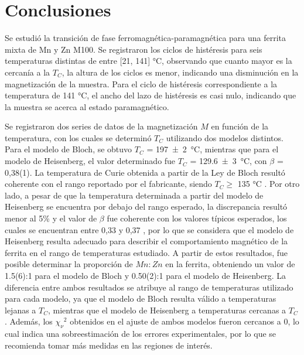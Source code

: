 \section{Conclusiones}

Se estudió la transición de fase ferromagnética-paramagnética para una ferrita mixta de Mn y Zn M100. Se registraron los ciclos de histéresis para seis temperaturas distintas de entre [21, 141] \si{\degreeCelsius}, observando que cuanto mayor es la cercanía a la $T_C$, la altura de los ciclos es menor, indicando una disminución en la magnetización de la muestra. Para el ciclo de histéresis correspondiente a la temperatura de 141 \si{\degreeCelsius}, el ancho del lazo de histéresis es casi nulo, indicando que la muestra se acerca al estado paramagnético.


Se registraron dos series de datos de la magnetización $M$ en función de la temperatura, con los cuales se determinó $T_C$ utilizando dos modelos distintos. Para el modelo de Bloch, se obtuvo $T_C$ = \SI{197(2)}{\celsius}, mientras que para el modelo de Heisenberg, el valor determinado fue $T_C$ = \SI{129,6(3)}{\celsius}, con $\beta$ = 0,38(1). La temperatura de Curie obtenida a partir de la Ley de Bloch resultó coherente con el rango reportado por el fabricante, siendo $T_C \geq$ 135 \si{\degreeCelsius} \cite{M100}. Por otro lado, a pesar de que la temperatura determinada a partir del modelo de Heisenberg se encuentra por debajo del rango esperado, la discrepancia resultó menor al 5\% y el valor de $\beta$ fue coherente con los valores típicos esperados, los cuales se encuentran entre 0,33 y 0,37 \cite{Bruvera}, por lo que se considera que el modelo de Heisenberg resulta adecuado para describir el comportamiento magnético de la ferrita en el rango de temperaturas estudiado. A partir de estos resultados, fue posible determinar la proporción de $Mn : Zn$ en la ferrita, obteniendo un valor de 1.5(6):1 para el modelo de Bloch y 0.50(2):1 para el modelo de Heisenberg. La diferencia entre ambos resultados se atribuye al rango de temperaturas utilizado para cada modelo, ya que el modelo de Bloch resulta válido a temperaturas lejanas a $T_C$, mientras que el modelo de Heisenberg a temperaturas cercanas a $T_C$. Además, los ${\chi_{\nu}}^2$ obtenidos en el ajuste de ambos modelos fueron cercanos a 0, lo cual indica una sobreestimación de los errores experimentales, por lo que se recomienda tomar más medidas en las regiones de interés.